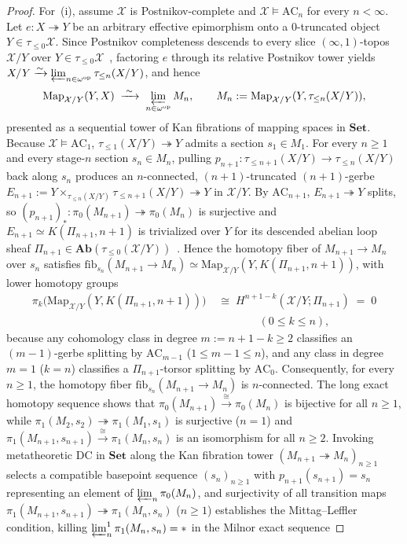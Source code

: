 \documentclass[10pt,twoside,openright]{book}
\theoremstyle{crmplain}
\theoremstyle{crmdef}
\theoremstyle{crmremark}
\begin{document}
\begin{proof}
For~(i), assume $\mathcal{X}$ is Postnikov-complete and $\mathcal{X} \models \mathrm{AC}_n$ for every $n < \infty$. Let $e : X \twoheadrightarrow Y$ be an arbitrary effective epimorphism onto a $0$-truncated object $Y \in \tau_{\le 0}\mathcal{X}$. Since Postnikov completeness descends to every slice $(\infty, 1)$-topos $\mathcal{X}/Y$ over $Y \in \tau_{\le 0}\mathcal{X}$~\cite[\S 5.5.6]{Lurie09}, factoring $e$ through its relative Postnikov tower yields $X/Y \xrightarrow{\sim} \varprojlim_{n \in \omega^{\mathrm{op}}} \tau_{\le n}(X/Y)$, and hence
\[
  \mathrm{Map}_{\mathcal{X}/Y}(Y, X) \;\xrightarrow{\;\sim\;}\; \varprojlim_{n \in \omega^{\mathrm{op}}} M_n, \qquad M_n := \mathrm{Map}_{\mathcal{X}/Y}(Y, \tau_{\le n}(X/Y)),
\]
presented as a sequential tower of Kan fibrations of mapping spaces in $\mathbf{Set}$. Because $\mathcal{X} \models \mathrm{AC}_1$, $\tau_{\le 1}(X/Y) \twoheadrightarrow Y$ admits a section $s_1 \in M_1$. For every $n \ge 1$ and every stage-$n$ section $s_n \in M_n$, pulling $p_{n+1} : \tau_{\le n+1}(X/Y) \to \tau_{\le n}(X/Y)$ back along $s_n$ produces an $n$-connected, $(n+1)$-truncated $(n+1)$-gerbe $E_{n+1} := Y \times_{\tau_{\le n}(X/Y)} \tau_{\le n+1}(X/Y) \twoheadrightarrow Y$ in $\mathcal{X}/Y$. By $\mathrm{AC}_{n+1}$, $E_{n+1} \twoheadrightarrow Y$ splits, so $(p_{n+1})_* : \pi_0(M_{n+1}) \twoheadrightarrow \pi_0(M_n)$ is surjective and $E_{n+1} \simeq K(\Pi_{n+1}, n+1)$ is trivialized over $Y$ for its descended abelian loop sheaf $\Pi_{n+1} \in \mathbf{Ab}(\tau_{\le 0}(\mathcal{X}/Y))$~\cite[\S 7.2.2]{Lurie09}. Hence the homotopy fiber of $M_{n+1} \to M_n$ over $s_n$ satisfies $\mathrm{fib}_{s_n}(M_{n+1} \to M_n) \simeq \mathrm{Map}_{\mathcal{X}/Y}(Y, K(\Pi_{n+1}, n+1))$, with lower homotopy groups
\[
  \begin{aligned}
    \pi_k\bigl(\mathrm{Map}_{\mathcal{X}/Y}(Y, K(\Pi_{n+1}, n+1))\bigr)
    &\;\cong\; H^{n+1-k}(\mathcal{X}/Y; \Pi_{n+1}) \;=\; 0 \\
    &\qquad\qquad (0 \le k \le n),
  \end{aligned}
\]
because any cohomology class in degree $m := n+1-k \ge 2$ classifies an $(m-1)$-gerbe splitting by $\mathrm{AC}_{m-1}$ ($1 \le m-1 \le n$), and any class in degree $m = 1$ ($k = n$) classifies a $\Pi_{n+1}$-torsor splitting by $\mathrm{AC}_0$. Consequently, for every $n \ge 1$, the homotopy fiber $\mathrm{fib}_{s_n}(M_{n+1} \to M_n)$ is $n$-connected. The long exact homotopy sequence shows that $\pi_0(M_{n+1}) \xrightarrow{\cong} \pi_0(M_n)$ is bijective for all $n \ge 1$, while $\pi_1(M_2, s_2) \twoheadrightarrow \pi_1(M_1, s_1)$ is surjective ($n = 1$) and $\pi_1(M_{n+1}, s_{n+1}) \xrightarrow{\cong} \pi_1(M_n, s_n)$ is an isomorphism for all $n \ge 2$. Invoking metatheoretic $\mathrm{DC}$ in $\mathbf{Set}$ along the Kan fibration tower $(M_{n+1} \twoheadrightarrow M_n)_{n \ge 1}$ selects a compatible basepoint sequence $(s_n)_{n \ge 1}$ with $p_{n+1}(s_{n+1}) = s_n$ representing an element of $\varprojlim_n \pi_0(M_n)$, and surjectivity of all transition maps $\pi_1(M_{n+1}, s_{n+1}) \twoheadrightarrow \pi_1(M_n, s_n)$ ($n \ge 1$) establishes the Mittag--Leffler condition, killing $\varprojlim^1_n \pi_1(M_n, s_n) = *$ in the Milnor exact sequence

\end{proof}
\end{document}
